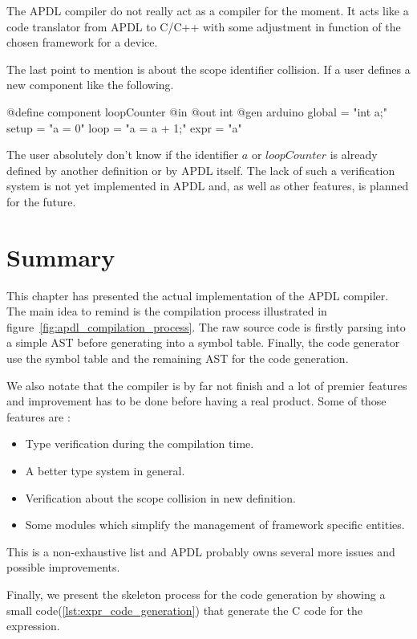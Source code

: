 The \gls{APDL} compiler do not really act as a compiler for the moment. It
acts like a code translator from \gls{APDL} to C/C++ with some adjustment in
function of the chosen framework for a device.

The last point to mention is about the scope identifier collision. If a user
defines a new component like the following.
\begin{inlineapdl}
@define component loopCounter {
    @in
    @out int
    @gen arduino {
        global = "int a;"
        setup = "a = 0"
        loop = "a = a + 1;"
        expr = "a"
  }
}
\end{inlineapdl}
The user absolutely don't know if the identifier $a$ or $loopCounter$ is already
defined by another definition or by \gls{APDL} itself. The lack of such a
verification system is not yet implemented in \gls{APDL} and, as well as other
features, is planned for the future.

\section{Summary}
\label{sec:implementation_summary}

This chapter has presented the actual implementation of the \gls{APDL} compiler.
The main idea to remind is the compilation process illustrated in
figure~\ref{fig:apdl_compilation_process}. The raw source code is firstly parsing
into a simple \gls{AST} before generating into a symbol table. Finally, the code
generator use the symbol table and the remaining \gls{AST} for the code
generation.

We also notate that the compiler is by far not finish and a lot of premier
features and improvement has to be done before having a real product. Some of
those features are :

\begin{itemize}
\item Type verification during the compilation time.
\item A better type system in general.
\item Verification about the scope collision in new definition.
\item Some modules which simplify the management of framework specific entities. 
\end{itemize}

This is a non-exhaustive list and \gls{APDL} probably owns several more issues
and possible improvements.

Finally, we present the skeleton process for the code generation by showing a
small code(\ref{lst:expr_code_generation}) that generate the C code for the
expression.

